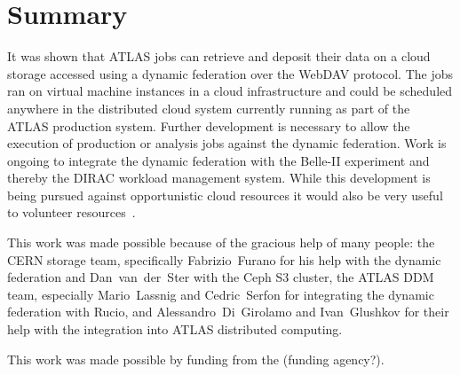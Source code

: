 \documentclass[a4paper]{jpconf}
\begin{document}


\section{Summary}
It was shown that ATLAS jobs can retrieve and deposit their data on a cloud storage accessed using a dynamic federation over the WebDAV protocol. The jobs ran on virtual machine instances in a cloud infrastructure and could be scheduled anywhere in the distributed cloud system currently running as part of the ATLAS production system. Further development is necessary to allow the execution of production or analysis jobs against the dynamic federation. Work is ongoing to integrate the dynamic federation with the Belle-II experiment and thereby the DIRAC workload management system. While this development is being pursued against opportunistic cloud resources it would also be very useful to volunteer resources~\cite{boinc}.


\ack
This work was made possible because of the gracious help of many people: the CERN storage team, specifically Fabrizio~Furano for his help with the dynamic federation and Dan~van~der~Ster with the Ceph S3 cluster, the ATLAS DDM team, especially Mario~Lassnig and Cedric~Serfon for integrating the dynamic federation with Rucio, and Alessandro~Di~Girolamo and Ivan~Glushkov for their help with the integration into ATLAS distributed computing.

This work was made possible by funding from the (funding agency?).
\end{document}
